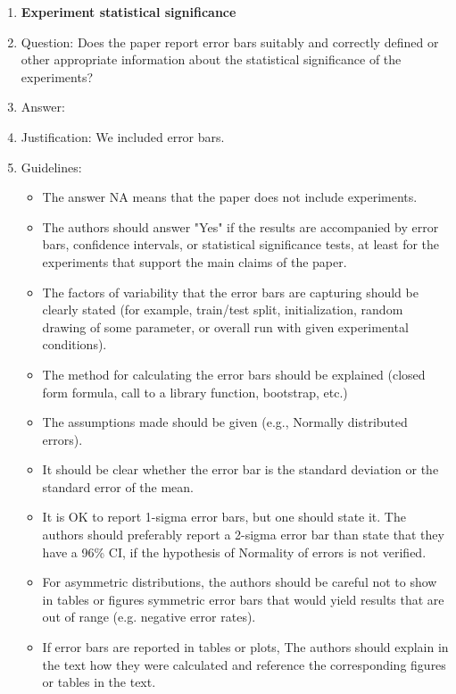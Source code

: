 \documentclass{article}
\begin{document}
\begin{enumerate}
\item {\bf Experiment statistical significance}
    \item[] Question: Does the paper report error bars suitably and correctly defined or other appropriate information about the statistical significance of the experiments?
    \item[] Answer: \answerYes{} %
    \item[] Justification: We included error bars.
    \item[] Guidelines:
    \begin{itemize}
        \item The answer NA means that the paper does not include experiments.
        \item The authors should answer "Yes" if the results are accompanied by error bars, confidence intervals, or statistical significance tests, at least for the experiments that support the main claims of the paper.
        \item The factors of variability that the error bars are capturing should be clearly stated (for example, train/test split, initialization, random drawing of some parameter, or overall run with given experimental conditions).
        \item The method for calculating the error bars should be explained (closed form formula, call to a library function, bootstrap, etc.)
        \item The assumptions made should be given (e.g., Normally distributed errors).
        \item It should be clear whether the error bar is the standard deviation or the standard error of the mean.
        \item It is OK to report 1-sigma error bars, but one should state it. The authors should preferably report a 2-sigma error bar than state that they have a 96\% CI, if the hypothesis of Normality of errors is not verified.
        \item For asymmetric distributions, the authors should be careful not to show in tables or figures symmetric error bars that would yield results that are out of range (e.g. negative error rates).
        \item If error bars are reported in tables or plots, The authors should explain in the text how they were calculated and reference the corresponding figures or tables in the text.
    \end{itemize}


\end{enumerate}
\end{document}

